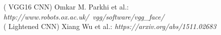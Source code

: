\begin{frame}[t]
{\begin{columns}[T]
\begin{column}{0.5\textwidth}
  \vspace{0.5cm}
  {\centering \tiny ({\color{blue} VGG16 CNN}) Omkar M. Parkhi et al.: \em http://www.robots.ox.ac.uk/~vgg/software/vgg\_face/}\\
  {\centering \tiny ({\color{blue} Lightened CNN}) Xiang Wu et al.: \em https://arxiv.org/abs/1511.02683}
\end{column}
\end{columns}}
\end{frame}
